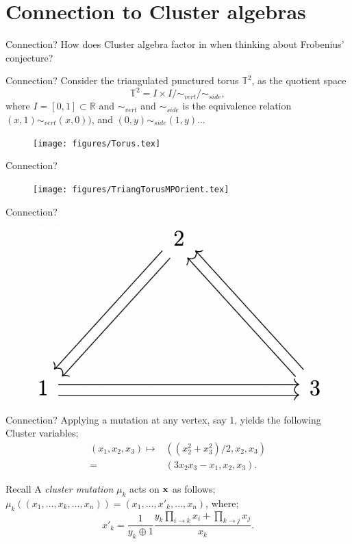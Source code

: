\documentclass{beamer}
\begin{document}
\section{Connection to Cluster algebras}

\begin{frame}{Connection?}
\centering
    How does Cluster algebra factor in when thinking about Frobenius' conjecture?
\end{frame}

\begin{frame}{Connection?}
    Consider the triangulated punctured torus $\mathbb{T}^2$, as the quotient space
    \begin{equation*}
        \mathbb{T}^2 = I \times I/\sim_{vert}/\sim_{side}, 
    \end{equation*}
    where $I = [0,1] \subset \mathbb{R}$ and $\sim_{vert}$ and $\sim_{side}$ is the equivalence relation $(x,1)\sim_{vert}(x,0))$, and $(0,y)\sim_{side}(1,y)$...
    \pause
    \begin{figure}
        \centering
        \texttt{[image: figures/Torus.tex]}
    \end{figure}
\end{frame}

\begin{frame}{Connection?}
\begin{figure}
    \centering\texttt{[image: figures/TriangTorusMPOrient.tex]}
\end{figure}    
\end{frame}

\begin{frame}{Connection?}
\begin{figure}
    \centering
    \includegraphics[width = 5 cm
]{Images/MarkovQuiverImgPres.png}
\end{figure}
\end{frame}
\begin{frame}{Connection?}
    Applying a mutation at any vertex, say 1, yields the following Cluster variables; \pause
    \begin{align*}
        (x_1,x_2,x_3) \mapsto &((x_2^2 + x^2_3)/2, x_2,x_3) \\
        =&(3x_2x_3 - x_1,x_2,x_3).
    \end{align*} \pause
    \begin{alertblock}{Recall}
        A \emph{cluster mutation} $\mu_k$ acts on $\bold{x}$ as follows; $\mu_k((x_1,\dots,x_k,\dots, x_n)) = (x_1,\dots,x'_k,\dots,x_n)$, where; \pause
\begin{equation*}
    x'_k = \dfrac{1}{y_k \oplus 1}\dfrac{y_k\prod_{i \to k}x_i + \prod_{k \to j}x_j}{x_k}.
\end{equation*}
    \end{alertblock}
\end{frame}
\end{document}
